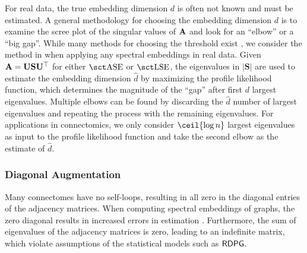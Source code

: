 For real data, the true embedding dimension $d$ is often not known and must be estimated. A general methodology for choosing the embedding dimension $d$ is to examine the scree plot of the singular values of $\operatorname{\mathbf{A}}$ and look for an ``elbow'' or a ``big gap''. While many methods for choosing the threshold exist \cite{jackson2005user,chatterjee2015matrix}, we consider the method in \cite{zhu2006automatic} when applying any spectral embeddings in real data. Given $\operatorname{\mathbf{A}}= \mathbf{U}\mathbf{S}\mathbf{U}^\top$ for either $\ase$ or $\lse$, the eigenvalues in $|\mathbf{S}|$ are used to estimate the embedding dimension $\hat d$ by maximizing the profile likelihood function, which determines the magnitude of the ``gap'' after first $d$ largest eigenvalues. Multiple elbows can be found by discarding the $\hat d$ number of largest eigenvalues and repeating the process with the remaining eigenvalues. For applications in connectomics, we only consider $\ceil{\log{n}}$ largest eigenvalues as input to the profile likelihood function and take the second elbow as the estimate of $\hat d$.


\subsubsection{Diagonal Augmentation}\label{sec:diag-aug}
Many connectomes have no self-loops, resulting in all zero in the diagonal entries of the adjacency matrices. When computing spectral embeddings of graphs, the zero diagonal results in increased errors in estimation \cite{tang2018connectome}. Furthermore, the sum of eigenvalues of the adjacency matrices is zero, leading to an indefinite matrix, which violate assumptions of the statistical models such as $\operatorname{\mathsf{RDPG}}$. 

